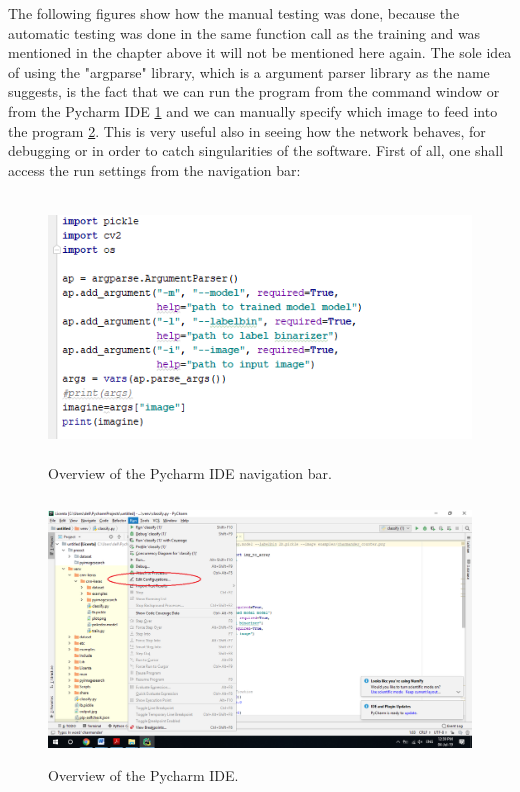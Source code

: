 \documentclass[12pt,a4paper,twoside]{report}
\begin{document}
The following figures show how the manual testing was done, because the automatic testing was done in the same function call as the training and was mentioned in the chapter above it will not be mentioned here again. The sole idea of using the "argparse" library, which is a argument parser library as the name suggests, is the fact that we can run the program from the command window or from the Pycharm IDE \ref{fig:run1} and we can manually specify which image to feed into the program \ref{fig:run2}. This is very useful also in seeing how the network behaves, for debugging or in order to catch singularities of the software. First of all, one shall access the run settings from the navigation bar:

\begin{figure}[h!]
	\centering
	\includegraphics[width=12cm, height=7cm]{img/data/imagerun1.png}
	\caption[]
	{Overview of the Pycharm IDE navigation bar.}
	\label{fig:run1}
\end{figure}
\begin{figure}[h]
	\centering
	\includegraphics[width=12cm, height=7cm]{img/data/imagerun2.png}
	\caption[]
	{Overview of the Pycharm IDE.}
	\label{fig:run2}
\end{figure}
\end{document}
